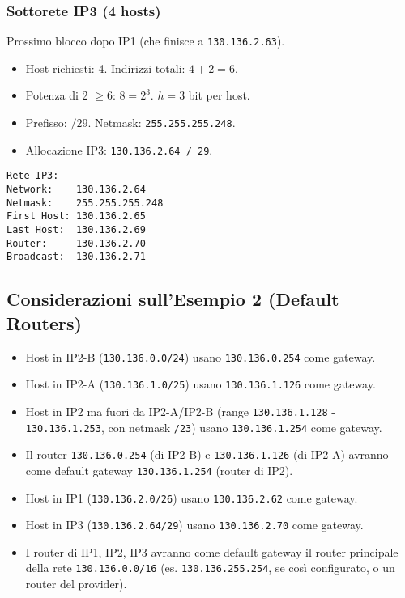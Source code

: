 \subsubsection{Sottorete IP3 (4 hosts)}
Prossimo blocco dopo IP1 (che finisce a \texttt{130.136.2.63}).
\begin{itemize}
    \item Host richiesti: 4. Indirizzi totali: $4 + 2 = 6$.
    \item Potenza di 2 $\geq 6$: $8 = 2^3$. $h=3$ bit per host.
    \item Prefisso: $/29$. Netmask: \texttt{255.255.255.248}.
    \item Allocazione IP3: \texttt{130.136.2.64 / 29}.
\end{itemize}
\begin{verbatim}
Rete IP3:
Network:    130.136.2.64
Netmask:    255.255.255.248
First Host: 130.136.2.65
Last Host:  130.136.2.69
Router:     130.136.2.70
Broadcast:  130.136.2.71
\end{verbatim}

\subsection{Considerazioni sull'Esempio 2 (Default Routers)}
\begin{itemize}
    \item Host in IP2-B (\texttt{130.136.0.0/24}) usano \texttt{130.136.0.254} come gateway.
    \item Host in IP2-A (\texttt{130.136.1.0/25}) usano \texttt{130.136.1.126} come gateway.
    \item Host in IP2 ma fuori da IP2-A/IP2-B (range \texttt{130.136.1.128} - \texttt{130.136.1.253}, con netmask \texttt{/23}) usano \texttt{130.136.1.254} come gateway.
    \item Il router \texttt{130.136.0.254} (di IP2-B) e \texttt{130.136.1.126} (di IP2-A) avranno come default gateway \texttt{130.136.1.254} (router di IP2).
    \item Host in IP1 (\texttt{130.136.2.0/26}) usano \texttt{130.136.2.62} come gateway.
    \item Host in IP3 (\texttt{130.136.2.64/29}) usano \texttt{130.136.2.70} come gateway.
    \item I router di IP1, IP2, IP3 avranno come default gateway il router principale della rete \texttt{130.136.0.0/16} (es. \texttt{130.136.255.254}, se così configurato, o un router del provider).
\end{itemize}

